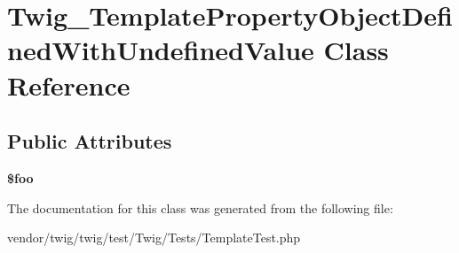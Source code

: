 \hypertarget{classTwig__TemplatePropertyObjectDefinedWithUndefinedValue}{}\section{Twig\+\_\+\+Template\+Property\+Object\+Defined\+With\+Undefined\+Value Class Reference}
\label{classTwig__TemplatePropertyObjectDefinedWithUndefinedValue}
\subsection*{Public Attributes}
\begin{DoxyCompactItemize}
\item 
{\bfseries \$foo}\hypertarget{classTwig__TemplatePropertyObjectDefinedWithUndefinedValue_ad3e708f068c67ea8810e46ec62de3cb2}{}\label{classTwig__TemplatePropertyObjectDefinedWithUndefinedValue_ad3e708f068c67ea8810e46ec62de3cb2}

\end{DoxyCompactItemize}


The documentation for this class was generated from the following file\+:\begin{DoxyCompactItemize}
\item 
vendor/twig/twig/test/\+Twig/\+Tests/Template\+Test.\+php\end{DoxyCompactItemize}
